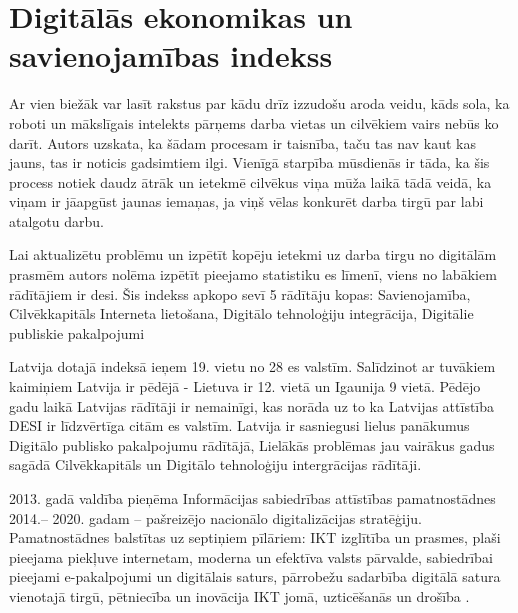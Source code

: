 \section{Digitālās ekonomikas un savienojamības indekss}
Ar vien biežāk var lasīt rakstus par kādu drīz izzudošu aroda veidu, kāds sola, ka roboti un 
mākslīgais intelekts pārņems darba vietas un cilvēkiem vairs nebūs ko darīt. Autors uzskata,
ka šādam procesam ir taisnība, taču tas nav kaut kas jauns, tas ir noticis gadsimtiem ilgi.
Vienīgā starpība mūsdienās ir tāda, ka šis process notiek daudz ātrāk un ietekmē cilvēkus viņa
mūža laikā tādā veidā, ka viņam ir jāapgūst jaunas iemaņas, ja viņš vēlas konkurēt darba tirgū
par labi atalgotu darbu.
\par
Lai aktualizētu problēmu un izpētīt kopēju ietekmi uz darba tirgu no digitālām prasmēm 
autors nolēma izpētīt pieejamo statistiku \gls{es} līmenī, viens no labākiem
rādītājiem ir \gls{desi}. Šis indekss apkopo sevī 5 rādītāju kopas: Savienojamība, Cilvēkkapitāls
Interneta lietošana, Digitālo tehnoloģiju integrācija, Digitālie publiskie pakalpojumi
\par
Latvija dotajā indeksā ieņem 19. vietu no 28 \acrshort{es} valstīm. Salīdzinot
ar tuvākiem kaimiņiem Latvija ir pēdējā - Lietuva ir 12. vietā un Igaunija 9 vietā. Pēdējo
gadu laikā Latvijas rādītāji ir nemainīgi, kas norāda uz to ka Latvijas attīstība DESI
ir līdzvērtīga citām \acrshort{es} valstīm. Latvija ir sasniegusi lielus panākumus 
Digitālo publisko pakalpojumu rādītājā, Lielākās problēmas jau vairākus gadus sagādā
Cilvēkkapitāls un Digitālo tehnoloģiju intergrācijas rādītāji.
\par
2013. gadā valdība pieņēma Informācijas sabiedrības attīstības pamatnostādnes 2014.–
2020. gadam – pašreizējo nacionālo digitalizācijas stratēģiju. Pamatnostādnes balstītas uz
septiņiem pīlāriem: IKT izglītība un prasmes, plaši pieejama piekļuve internetam, moderna
un efektīva valsts pārvalde, sabiedrībai pieejami e-pakalpojumi un digitālais saturs,
pārrobežu sadarbība digitālā satura vienotajā tirgū, pētniecība un inovācija IKT jomā,
uzticēšanās un drošība \cite{desi_Latvija} \cite{soc_dev}.
